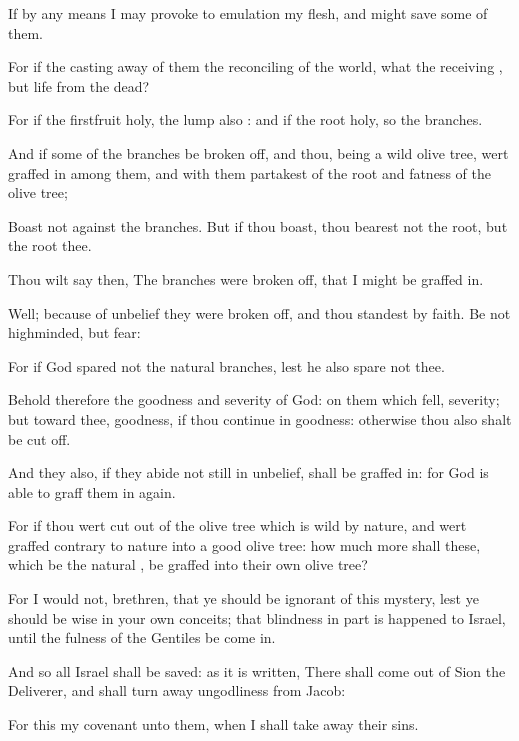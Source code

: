 {If by any
means I may provoke to
emulation
{}
my
flesh,
and might
save
some
of
them.

For
if the casting
away of
them
{} the
reconciling of the
world,
what
{} the
receiving
{},
but
life
from the
dead?

For
if the
firstfruit
{}
holy, the
lump
{}
also
{}:
and
if the
root
{}
holy,
so
{} the
branches.

And
if
some of the
branches be broken
off,
and
thou,
being a wild olive
tree, wert
graffed
in among
them,
and with them
partakest of the
root
and
fatness of the olive
tree;

Boast
not against the
branches.
But
if thou
boast,
thou
bearest
not the
root,
but the
root
thee.

Thou wilt
say
then, The
branches were broken
off,
that
I might be graffed
in.

Well; because of
unbelief they were broken
off,
and
thou
standest by
faith.
Be
not
highminded,
but
fear:

For
if
God
spared
not
the
natural
branches,
{}
lest
he
also
spare
not
thee.

Behold
therefore the
goodness
and
severity of
God:
on them which
fell,
severity;
but
toward
thee,
goodness,
if thou
continue
in
{}
goodness:
otherwise
thou
also shalt be cut
off.

And
they
also,
if they
abide
not
still in
unbelief, shall be graffed
in:
for
God
is
able to
graff
them
in
again.

For
if
thou wert cut
out
of the olive tree which is
wild
by
nature,
and wert
graffed contrary
to
nature
into a good olive
tree: how
much
more
shall
these, which
be the
natural
{}, be graffed
into their
own olive
tree?


\par }{\PP {}For I
would
not,
brethren,
that
ye should be ignorant
of
this
mystery,
lest ye should
be
wise
in your own
conceits;
that
blindness
in
part is
happened to
Israel,
until the
fulness of the
Gentiles be come
in.

And
so
all
Israel shall be
saved:
as it is
written, There shall
come out
of
Sion the
Deliverer,
and shall turn
away
ungodliness
from
Jacob:

For
this
{}
my
covenant unto
them,
when I shall take
away
their
sins.

}
